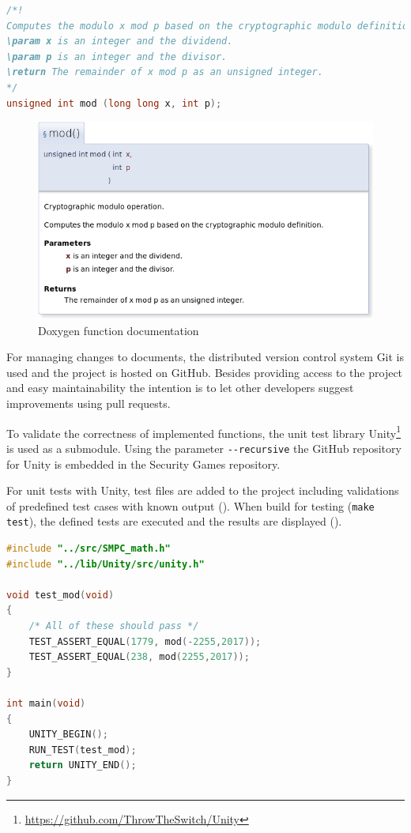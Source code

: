 \begin{lstlisting}[language=C, caption={Doxygen function annotation}, label={Doxygen function annotation}]
/*!
Computes the modulo x mod p based on the cryptographic modulo definition.
\param x is an integer and the dividend.
\param p is an integer and the divisor.
\return The remainder of x mod p as an unsigned integer.
*/
unsigned int mod (long long x, int p);
\end{lstlisting}

\begin{figure}[!htbp] %
	\caption{Doxygen function documentation} \label{Doxygen function documentation}
	\includegraphics[scale=1.4]{figures/doxygen.png}
\end{figure}

For managing changes to documents, the distributed version control system Git is used and the project is hosted on GitHub. Besides providing access to the project and easy maintainability the intention is to let other developers suggest improvements using pull requests.

To validate the correctness of implemented functions, the unit test library Unity\footnote{\url{https://github.com/ThrowTheSwitch/Unity}} is used as a submodule. Using the parameter \lstinline|--recursive| the GitHub repository for Unity is embedded in the Security Games repository. 

For unit tests with Unity, test files are added to the project including validations of predefined test cases with known output (). When build for testing (\lstinline|make test|), the defined tests are executed and the results are displayed ().

\begin{lstlisting}[language=C, caption=Unity test file, label={Unity test file}, float,floatplacement=H]
#include "../src/SMPC_math.h"
#include "../lib/Unity/src/unity.h"

void test_mod(void)
{
	/* All of these should pass */
	TEST_ASSERT_EQUAL(1779, mod(-2255,2017));
	TEST_ASSERT_EQUAL(238, mod(2255,2017));
}

int main(void)
{
	UNITY_BEGIN();
	RUN_TEST(test_mod);
	return UNITY_END();
}
\end{lstlisting}

